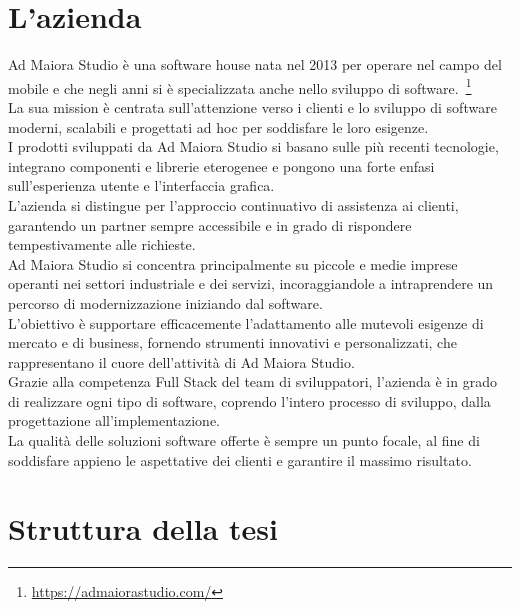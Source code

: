 \section{L'azienda}

Ad Maiora Studio è una software house nata nel 2013 per operare nel campo del mobile e che negli anni si è specializzata anche nello sviluppo di software.~\footnote{\url{https://admaiorastudio.com/}}\\
La sua mission è centrata sull'attenzione verso i clienti e lo sviluppo di software moderni, scalabili e progettati ad hoc per soddisfare le loro esigenze. \\
I prodotti sviluppati da Ad Maiora Studio si basano sulle più recenti tecnologie, integrano componenti e librerie eterogenee e pongono una forte enfasi sull'esperienza utente
 e l'interfaccia grafica.\\
L'azienda si distingue per l'approccio continuativo di assistenza ai clienti, 
garantendo un partner sempre accessibile e in grado di rispondere tempestivamente alle richieste. \\
Ad Maiora Studio si concentra principalmente su piccole e medie imprese operanti nei settori industriale e dei servizi, incoraggiandole a intraprendere un percorso di modernizzazione
 iniziando dal software.\\
L'obiettivo è supportare efficacemente l'adattamento alle mutevoli esigenze di mercato e di business, fornendo strumenti innovativi e personalizzati, che rappresentano il cuore dell'attività di Ad Maiora Studio.\\
Grazie alla competenza Full Stack del team di sviluppatori, l'azienda è in grado di realizzare ogni tipo di software, 
coprendo l'intero processo di sviluppo, dalla progettazione all'implementazione.\\
La qualità delle soluzioni software offerte è sempre un punto focale, al fine di soddisfare appieno le aspettative dei clienti e garantire il massimo risultato.



\section{Struttura della tesi}

